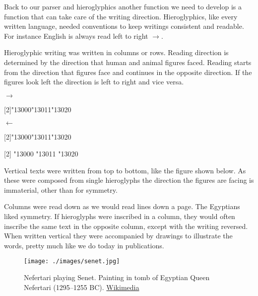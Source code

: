 Back to our parser and hieroglyphics another function we need to develop is a function that can take care of the writing direction. Hieroglyphics, like every written language,  needed conventions to keep writings consistent and readable. For instance English is always read left to right $\rightarrow$. 

Hieroglyphic writing was written in columns or rows. Reading direction is determined by the direction that human and animal figures faced. Reading starts from the direction that figures face and continues in the opposite direction. If the figures look left the direction is left to right and vice versa.

\begin{center}
\bgroup
$\rightarrow$

\scalebox{2}[2]{\hiero\char"13000\char"13011\char"13020}

$\leftarrow$

\scalebox{-2}[2]{\hiero\char"13000\char"13011\char"13020}

\scalebox{2}[2]{\hiero
\char"13000
\char"13011
\char"13020}
\egroup
\end{center}

Vertical texts were written from top to bottom, like the figure shown below. As these were composed from single hieroglyphs the direction the figures are facing is immaterial, other than for symmetry.

\begin{center}
{\hiero
\makebox[3em]{\scalebox{-2}[2]{\hiero
\char"13001}\hss}
\vskip3pt
\makebox[3em]{\scalebox{-2}[2]{\hiero
\char"13006}\hss}
\vskip3pt
\makebox[3em]{\scalebox{-2}[2]{\hiero
\char"13007}\hss}
}
\end{center}

Columns were read down as we would read lines down a page. The Egyptians liked symmetry. If hieroglyphs were inscribed in a column, they would often inscribe the same text in the opposite column, except with the writing reversed. When written vertical they were accompanied by drawings to illustrate the words, pretty much like we do today in publications.

\begin{figure}[hb]
\centering
\texttt{[image: ./images/senet.jpg]}
\caption{Nefertari playing Senet. Painting in tomb of Egyptian Queen Nefertari (1295–1255 BC). \href{http://en.wikipedia.org/wiki/Senet}{Wikimedia}}
\end{figure}



